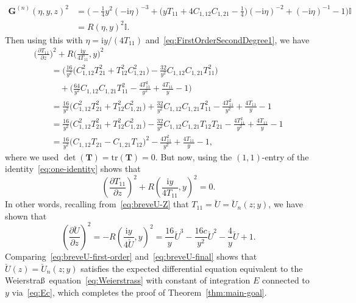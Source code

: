 \begin{align*}
\mathbf{G}^{(n)}(\eta,y,z)^2 &{}= \bigl(-\tfrac{1}{4}y^2(-\mathrm{i}\eta)^{-3} + \bigl(yT_{11}+4C_{1,12}C_{1,21}-\tfrac{1}{4}\bigr)(-\mathrm{i}\eta)^{-2}+(-\mathrm{i}\eta)^{-1}-1\bigr)\mathbb{I} \\
&{}=R(\eta,y)^2\mathbb{I}.
\end{align*}
Then using this with $\eta=\mathrm{i} y/(4T_{11})$ and~\eqref{eq:FirstOrderSecondDegree1}, we have
\begin{gather*}
\bigg(\frac{\partial T_{11}}{\partial z}\bigg)^2+R\bigg(\frac{\mathrm{i} y}{4T_{11}},y\bigg)^2\\
\qquad {} =
\bigg(\frac{16}{y^2}\bigl(C_{1,12}^2T_{21}^2+T_{12}^2C_{1,21}^2\bigr)-\frac{32}{y^2}C_{1,12}C_{1,21}T_{11}^2\bigg) \\
\qquad\quad {}
 +\bigg(\frac{64}{y^2}C_{1,12}C_{1,21}T_{11}^2-\frac{4T_{11}^2}{y^2}+\frac{4T_{11}}{y}-1\bigg)\\
\qquad{} = \frac{16}{y^2}\bigl(C_{1,12}^2T_{21}^2+T_{12}^2C_{1,21}^2\bigr)+\frac{32}{y^2}C_{1,12}C_{1,21}T_{11}^2 -\frac{4T_{11}^2}{y^2}+\frac{4T_{11}}{y}-1\\
\qquad{} = \frac{16}{y^2}\bigl(C_{1,12}^2T_{21}^2+T_{12}^2C_{1,21}^2\bigr)-\frac{32}{y^2}C_{1,12}C_{1,21}T_{12}T_{21}
 -\frac{4T_{11}^2}{y^2}+\frac{4T_{11}}{y}-1\\
\qquad{} = \frac{16}{y^2}\bigl(C_{1,12}T_{21}-C_{1,21}T_{12}\bigr)^2-\frac{4T_{11}^2}{y^2}+\frac{4T_{11}}{y}-1,
\end{gather*}
where we used $\det(\mathbf{T})=\mathrm{tr}(\mathbf{T})=0$. But now, using the $(1,1)$-entry of the identity~\eqref{eq:one-identity} shows that
\begin{equation*}
\left(\frac{\partial T_{11}}{\partial z}\right)^2+R\left(\frac{\mathrm{i} y}{4T_{11}},y\right)^2=0.
\end{equation*}
In other words, recalling from~\eqref{eq:breveU-Z} that $T_{11}=\breve{U}=\breve{U}_n(z;y)$, we have shown that
\begin{equation}
\left(\frac{\partial\breve{U}}{\partial z}\right)^2=-R\left(\frac{\mathrm{i} y}{4\breve{U}},y\right)^2 = \frac{16}{y}\breve{U}^3-\frac{16c}{y^2}\breve{U}^2-\frac{4}{y}\breve{U}+1.
\label{eq:breveU-final}
\end{equation}
Comparing~\eqref{eq:breveU-first-order} and~\eqref{eq:breveU-final} shows that $\breve{U}(z)=\breve{U}_n(z;y)$ satisfies the expected differential equation equivalent to the Weierstra\ss\ equation~\eqref{eq:Weierstrass} with constant of integration $E$ connected to $y$ via~\eqref{eq:Ec},
which completes the proof of Theorem~\ref{thm:main-goal}.
